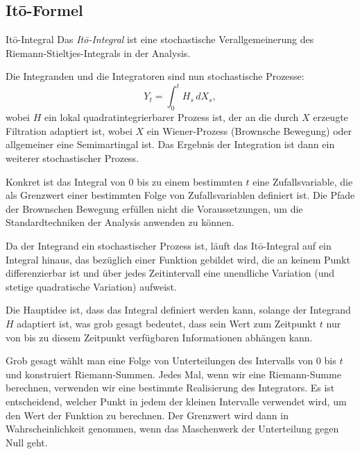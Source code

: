 \subsection{Itō-Formel}

\begin{bonus}{Itō-Integral}
    Das \emph{Itō-Integral} ist eine stochastische Verallgemeinerung des Riemann-Stieltjes-Integrals in der Analysis.

    Die Integranden und die Integratoren sind nun stochastische Prozesse:
    \[
        Y_{t}=\int_{0}^{t}H_{s}\,dX_{s},
    \]
    wobei $H$ ein lokal quadratintegrierbarer Prozess ist, der an die durch $X$ erzeugte Filtration adaptiert ist, wobei $X$ ein Wiener-Prozess (Brownsche Bewegung) oder allgemeiner eine Semimartingal ist.
    Das Ergebnis der Integration ist dann ein weiterer stochastischer Prozess.

    Konkret ist das Integral von $0$ bis zu einem bestimmten $t$ eine Zufallsvariable, die als Grenzwert einer bestimmten Folge von Zufallsvariablen definiert ist.
    Die Pfade der Brownschen Bewegung erfüllen nicht die Voraussetzungen, um die Standardtechniken der Analysis anwenden zu können.

    Da der Integrand ein stochastischer Prozess ist, läuft das Itō-Integral auf ein Integral hinaus, das bezüglich einer Funktion gebildet wird, die an keinem Punkt differenzierbar ist und über jedes Zeitintervall eine unendliche Variation (und stetige quadratische Variation) aufweist.

    Die Hauptidee ist, dass das Integral definiert werden kann, solange der Integrand $H$ adaptiert ist, was grob gesagt bedeutet, dass sein Wert zum Zeitpunkt $t$ nur von bis zu diesem Zeitpunkt verfügbaren Informationen abhängen kann.

    Grob gesagt wählt man eine Folge von Unterteilungen des Intervalls von $0$ bis $t$ und konstruiert Riemann-Summen.
    Jedes Mal, wenn wir eine Riemann-Summe berechnen, verwenden wir eine bestimmte Realisierung des Integrators.
    Es ist entscheidend, welcher Punkt in jedem der kleinen Intervalle verwendet wird, um den Wert der Funktion zu berechnen.
    Der Grenzwert wird dann in Wahrscheinlichkeit genommen, wenn das Maschenwerk der Unterteilung gegen Null geht.
\end{bonus}

